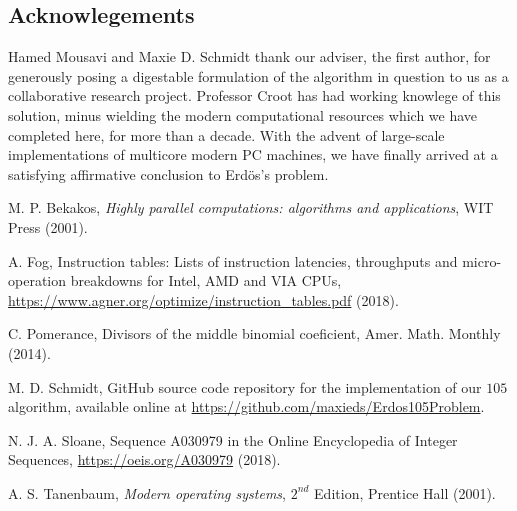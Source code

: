 \documentclass[12pt]{article}
\begin{document}
\subsection*{Acknowlegements} 

Hamed Mousavi and Maxie D. Schmidt thank our adviser, the first author, 
for generously posing a digestable formulation of the algorithm in question to us as a 
collaborative research project. Professor Croot has had working knowlege of this solution, minus 
wielding the modern computational resources which we have completed here, for more than a decade. 
With the advent of large-scale implementations of multicore modern PC machines, we have finally 
arrived at a satisfying affirmative conclusion to Erd\"os's problem. 

\begin{thebibliography}{10} 

M. P. Bekakos, \emph{Highly parallel computations: algorithms and applications}, WIT Press (2001). 

A. Fog, Instruction tables: Lists of instruction latencies, throughputs and micro-operation breakdowns for Intel, AMD and VIA CPUs, \url{https://www.agner.org/optimize/instruction_tables.pdf} (2018). 

C. Pomerance, Divisors of the middle binomial coeficient, Amer. Math. Monthly (2014). 

M. D. Schmidt, GitHub source code repository for the implementation of our $105$ algorithm, 
  available online at \url{https://github.com/maxieds/Erdos105Problem}. 

N. J. A. Sloane, Sequence A030979 in the Online Encyclopedia of Integer Sequences, 
  \url{https://oeis.org/A030979} (2018). 
  
A. S. Tanenbaum, \emph{Modern operating systems}, $2^{nd}$ Edition, Prentice Hall (2001). 

\end{thebibliography} 
\end{document}
